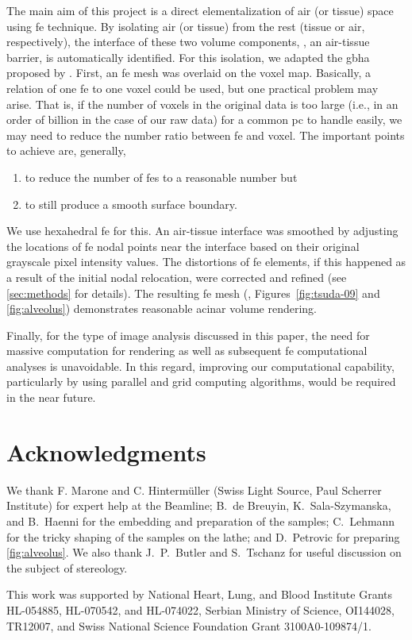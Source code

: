 The main aim of this project is a direct elementalization of air (or tissue) space using \ac{fe} technique. By isolating air (or tissue) from the rest (tissue or air, respectively), the interface of these two volume components, \ie, an air-tissue barrier, is automatically identified. For this isolation, we adapted the \ac{gbha} proposed by \citet{Schneiders1996}. First, an \ac{fe} mesh was overlaid on the voxel map. Basically, a relation of one \ac{fe} to one voxel could be used, but one practical problem may arise. That is, if the number of voxels in the original data is too large (i.e., in an order of billion in the case of our raw data) for a common \ac{pc} to handle easily, we may need to reduce the number ratio between \ac{fe} and voxel. The important points to achieve are, generally, 
\begin{enumerate}
	\item to reduce the number of \acp{fe} to a reasonable number but
	\item to still produce a smooth surface boundary.
\end{enumerate}
We use hexahedral \ac{fe} for this. An air-tissue interface was smoothed by adjusting the locations of \ac{fe} nodal points near the interface based on their original grayscale pixel intensity values. The distortions of \ac{fe} elements, if this happened as a result of the initial nodal relocation, were corrected and refined (see \autoref{sec:methods} for details). The resulting \threed \ac{fe} mesh (\eg, Figures~\ref{fig:tsuda-09} and \ref{fig:alveolus}) demonstrates reasonable acinar volume rendering.

Finally, for the type of image analysis discussed in this paper, the need for massive computation for \threed rendering as well as subsequent \ac{fe} computational analyses is unavoidable. In this regard, improving our computational capability, particularly by using parallel and grid computing algorithms, would be required in the near future.

\section{Acknowledgments}
We thank F. Marone and C. Hintermüller (Swiss Light Source, Paul Scherrer Institute) for expert help at the Beamline; B.\ de Breuyin, K.\ Sala-Szymanska, and B.\ Haenni for the embedding and preparation of the samples; C.\ Lehmann for the tricky shaping of the samples on the lathe; and D.\ Petrovic for preparing \autoref{fig:alveolus}. We also thank J.\ P.\ Butler and S.\ Tschanz for useful discussion on the subject of stereology.

This work was supported by National Heart, Lung, and Blood Institute Grants HL-054885, HL-070542, and HL-074022, Serbian Ministry of Science, OI144028, TR12007, and Swiss National Science Foundation Grant 3100A0-109874/1.
%
%
